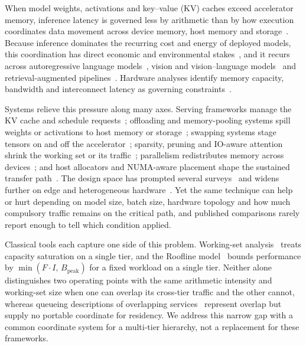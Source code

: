 \label{sec:introduction}

When model weights, activations and key--value (KV) caches exceed accelerator
memory, inference latency is governed less by arithmetic than by how execution
coordinates data movement across device memory, host memory and
storage~\cite{ma2026inference,gholami2024memorywall}. Because inference
dominates the recurring cost and energy of deployed models, this coordination
has direct economic and environmental
stakes~\cite{iea2024electricity,stojkovic2025dynamollm,juniewicz2026hyperscaler},
and it recurs across autoregressive language
models~\cite{grattafiori2024llama,jiang2024mixtral}, vision and
vision--language models~\cite{dosovitskiy2021vit,li2023blip2} and
retrieval-augmented pipelines~\cite{johnson2019faiss}. Hardware analyses
identify memory capacity, bandwidth and interconnect latency as governing
constraints~\cite{zhou2024survey,li2024llm,miao2025towards}.

Systems relieve this pressure along many axes. Serving frameworks manage the KV
cache and schedule
requests~\cite{kwon2023pagedattention,yu2022orca,du2025prefillonly,jin2024p};
offloading and memory-pooling systems spill weights or activations to host
memory or
storage~\cite{flexgen2023,aminabadi2022deepspeedinference,xu2024pie,neo2024,2025specoffload,ellm2023};
swapping systems stage tensors on and off the
accelerator~\cite{huang2020swapadvisor,wang2024swapnet,kida2025revisiting};
sparsity, pruning and IO-aware attention shrink the working set or its
traffic~\cite{frantar2023sparsegpt,dao2022flashattention,korthikanti2023reducing};
parallelism redistributes memory across
devices~\cite{huang2019gpipe,shoeybi2019megatronlm}; and host allocators and
NUMA-aware placement shape the sustained transfer
path~\cite{osdi21malloc,yang2023numalloc,milic2017beyond,waldspurger2002ballooning}.
The design space has prompted several
surveys~\cite{long2025survey,wang2020convergence} and widens further on edge and
heterogeneous
hardware~\cite{sarkar2023edge,luo2025toward,he2023cpu,beaumont2020optimal}. Yet
the same technique can help or hurt depending on model size, batch size,
hardware topology and how much compulsory traffic remains on the critical path,
and published comparisons rarely report enough to tell which condition applied.

Classical tools each capture one side of this problem. Working-set
analysis~\cite{mattson1970evaluation} treats capacity saturation on a single
tier, and the Roofline model~\cite{williams2009roofline} bounds performance by
$\min(F \cdot I,\, B_{\mathrm{peak}})$ for a fixed workload on a single tier.
Neither alone distinguishes two operating points with the same arithmetic
intensity and working-set size when one can overlap its cross-tier traffic and
the other cannot, whereas queueing descriptions of overlapping
services~\cite{kleinrock1975queueing} represent overlap but supply no portable
coordinate for residency. We address this narrow gap with a common coordinate
system for a multi-tier hierarchy, not a replacement for these frameworks.

